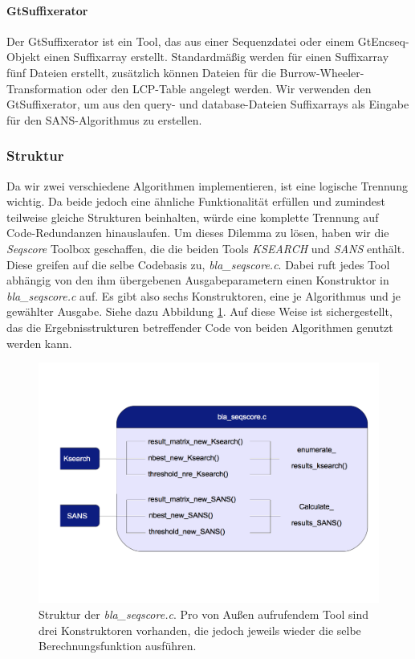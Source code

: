 \documentclass{article}
\begin{document}
\paragraph{GtSuffixerator}
Der GtSuffixerator ist ein Tool, das aus einer Sequenzdatei oder einem GtEncseq-Objekt einen Suffixarray erstellt. Standardmäßig werden für einen Suffixarray fünf Dateien erstellt, zusätzlich können Dateien für die Burrow-Wheeler-Transformation oder den LCP-Table angelegt werden. Wir verwenden den GtSuffixerator, um aus den query- und database-Dateien Suffixarrays als Eingabe für den SANS-Algorithmus zu erstellen.

\subsubsection{Struktur}

Da wir zwei verschiedene Algorithmen implementieren, ist eine logische Trennung wichtig. Da beide jedoch eine ähnliche Funktionalität erfüllen und
zumindest teilweise gleiche Strukturen beinhalten, würde eine komplette Trennung auf Code-Redundanzen hinauslaufen. Um dieses Dilemma zu lösen, haben wir
die \emph{Seqscore} Toolbox geschaffen, die die beiden Tools \emph{KSEARCH} und \emph{SANS} enthält. Diese greifen auf die selbe Codebasis zu, 
\emph{bla\_seqscore.c}. Dabei ruft jedes Tool abhängig von den ihm übergebenen Ausgabeparametern einen Konstruktor in \emph{bla\_seqscore.c} auf. Es gibt also
sechs Konstruktoren, eine je Algorithmus und je gewählter Ausgabe. Siehe dazu Abbildung \ref{seqsc}. Auf diese Weise ist sichergestellt, das die 
Ergebnisstrukturen betreffender Code von beiden Algorithmen genutzt werden kann.

\begin{center}
  \begin{figure}
    \includegraphics[width = \linewidth]{img/dia2}
    \caption{Struktur der \emph{bla\_seqscore.c}. Pro von Außen aufrufendem Tool sind drei Konstruktoren vorhanden, die jedoch jeweils wieder die
    selbe Berechnungsfunktion ausführen.}
    \label{seqsc}
  \end{figure}
\end{center}
\end{document}
